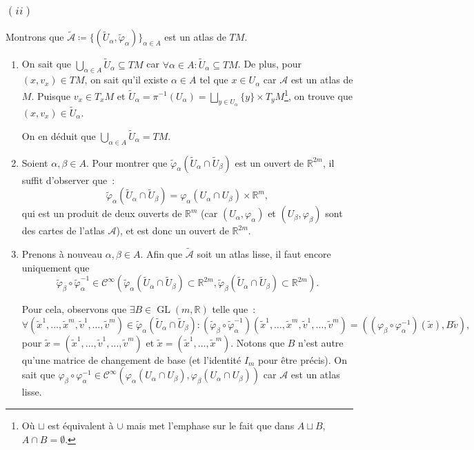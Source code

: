 \documentclass{article}
\newcommand{\R}{\mathbb R}
\DeclareMathOperator{\GL}{GL}
\begin{document}
\subsubsection*{$(ii)$}
Montrons que $\widetilde {\mathcal A} \coloneqq \{(\widetilde U_\alpha, \widetilde \varphi_\alpha)\}_{\alpha \in A}$ est un atlas de $TM$.

\begin{enumerate}
	\item On sait que $\bigcup_{\alpha \in A} \widetilde U_\alpha \subseteq TM$ car $\forall \alpha \in A : \widetilde U_\alpha \subseteq TM$.
		De plus, pour $(x, v_x) \in TM$, on sait qu'il existe $\alpha \in A$ tel que $x \in U_\alpha$ car $\mathcal A$ est un atlas de $M$.
		Puisque $v_x \in T_xM$ et $\widetilde U_\alpha = \pi^{-1}(U_\alpha) = \bigsqcup_{y \in U_\alpha} \{y\} \times T_yM$\footnote{Où $\sqcup$ est
		équivalent à $\cup$ mais met l'emphase sur le fait que dans $A \sqcup B$, $A \cap B = \emptyset$.}, on trouve que
		$(x, v_x) \in \widetilde U_\alpha$.

		On en déduit que $\bigcup_{\alpha \in A} \widetilde U_\alpha = TM$.

	\item Soient $\alpha, \beta \in A$. Pour montrer que $\widetilde \varphi_\alpha(\widetilde U_\alpha \cap \widetilde U_\beta)$ est un ouvert
		de $\R^{2m}$, il suffit d'observer que~:
		\[\widetilde \varphi_\alpha(\widetilde U_\alpha \cap \widetilde U_\beta) = \varphi_\alpha(U_\alpha \cap U_\beta) \times \R^m,\]
		qui est un produit de deux ouverts de $\R^m$ (car $(U_\alpha, \varphi_\alpha)$ et $(U_\beta, \varphi_\beta)$ sont des cartes de
		l'atlas $\mathcal A$), et est donc un ouvert de $\R^{2m}$.

	\item Prenons à nouveau $\alpha, \beta \in A$. Afin que $\widetilde {\mathcal A}$ soit un atlas lisse, il faut encore uniquement que
		\[\widetilde \varphi_\beta \circ \widetilde \varphi_\alpha^{-1} \in
			\mathcal C^\infty\left(\widetilde \varphi_\alpha(\widetilde U_\alpha \cap \widetilde U_\beta) \subset \R^{2m},
				\widetilde \varphi_\beta(\widetilde U_\alpha \cap \widetilde U_\beta) \subset \R^{2m}\right).
		\]

		Pour cela, observons que $\exists B \in \GL(m, \R)$ telle que~:
		\[\forall (\tilde x^1, \ldots, \tilde x^m, \tilde v^1, \ldots, \tilde v^m) \in \widetilde \varphi_\alpha(\widetilde U_\alpha \cap \widetilde U_\beta) :
			(\widetilde \varphi_\beta \circ \widetilde \varphi_\alpha^{-1})(\tilde x^1, \ldots, \tilde x^m, \tilde v^1, \ldots, \tilde v^m)
				= \left((\varphi_\beta \circ \varphi_\alpha^{-1})(\tilde x), B\tilde v\right),\]
		pour $\tilde x = (\tilde x^1, \ldots, \tilde v^1, \ldots, \tilde v^m)$ et $\tilde x = (\tilde x^1, \ldots, \tilde x^m)$.
		Notons que $B$ n'est autre qu'une matrice de changement de base (et l'identité $I_m$ pour être précis). On sait que
		$\varphi_\beta \circ \varphi_\alpha^{-1} \in 	\mathcal C^\infty(\varphi_\alpha(U_\alpha \cap U_\beta), \varphi_\beta(U_\alpha \cap U_\beta))$
		car $\mathcal A$ est un atlas lisse.


\end{enumerate}
\end{document}
